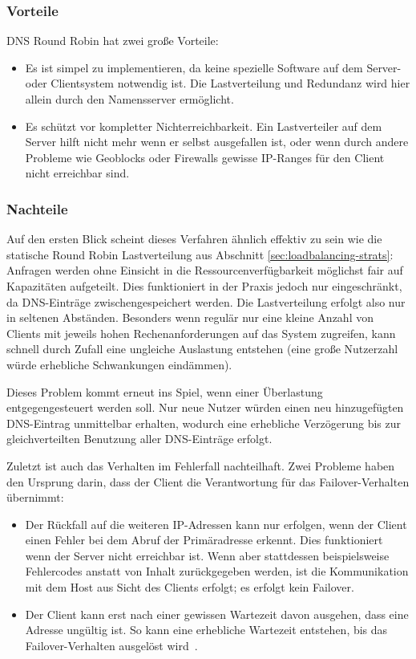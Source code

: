 \subsubsection{Vorteile}
DNS Round Robin hat zwei große Vorteile:
\begin{itemize}
	\item Es ist simpel zu implementieren, da keine spezielle Software auf dem Server- oder Clientsystem notwendig ist. Die Lastverteilung und Redundanz wird hier allein durch den Namensserver ermöglicht.
	\item Es schützt vor kompletter Nichterreichbarkeit. Ein Lastverteiler auf dem Server hilft nicht mehr wenn er selbst ausgefallen ist, oder wenn durch andere Probleme wie Geoblocks oder Firewalls gewisse IP-Ranges für den Client nicht erreichbar sind.
\end{itemize}

\subsubsection{Nachteile}
Auf den ersten Blick scheint dieses Verfahren ähnlich effektiv zu sein wie die statische Round Robin Lastverteilung aus Abschnitt \ref{sec:loadbalancing-strats}: Anfragen werden ohne Einsicht in die Ressourcenverfügbarkeit möglichst fair auf Kapazitäten aufgeteilt. Dies funktioniert in der Praxis jedoch nur eingeschränkt, da DNS-Einträge zwischengespeichert werden. Die Lastverteilung erfolgt also nur in seltenen Abständen. Besonders wenn regulär nur eine kleine Anzahl von Clients mit jeweils hohen Rechenanforderungen auf das System zugreifen, kann schnell durch Zufall eine ungleiche Auslastung entstehen (eine große Nutzerzahl würde erhebliche Schwankungen eindämmen).

Dieses Problem kommt erneut ins Spiel, wenn einer Überlastung entgegengesteuert werden soll. Nur neue Nutzer würden einen neu hinzugefügten DNS-Eintrag unmittelbar erhalten, wodurch eine erhebliche Verzögerung bis zur gleichverteilten Benutzung aller DNS-Einträge erfolgt.

Zuletzt ist auch das Verhalten im Fehlerfall nachteilhaft. Zwei Probleme haben den Ursprung darin, dass der Client die Verantwortung für das Failover-Verhalten übernimmt:
\begin{itemize}
	\item Der Rückfall auf die weiteren IP-Adressen kann nur erfolgen, wenn der Client einen Fehler bei dem Abruf der Primäradresse erkennt. Dies funktioniert wenn der Server nicht erreichbar ist. Wenn aber stattdessen beispielsweise Fehlercodes anstatt von Inhalt zurückgegeben werden, ist die Kommunikation mit dem Host aus Sicht des Clients erfolgt; es erfolgt kein Failover.
	\item Der Client kann erst nach einer gewissen Wartezeit davon ausgehen, dass eine Adresse ungültig ist. So kann eine erhebliche Wartezeit entstehen, bis das Failover-Verhalten ausgelöst wird~\cite{so-dns-slow}.%








\end{itemize}
